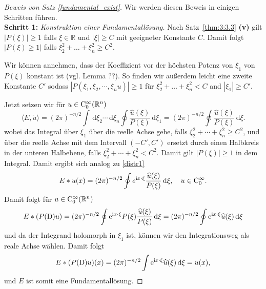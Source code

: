 \begin{proof}[Beweis von Satz \ref{fundamental_exist}]
Wir werden diesen Beweis in einigen Schritten führen.
\vspace{1mm}\\
\textbf{Schritt 1:} \emph{Konstruktion einer Fundamentallösung.}
Nach Satz~\ref{thm:3:3.3} {\bf (v)} gilt $|P(\xi)|\ge 1$ falls $\xi\in \mathbb R$ und $|\xi|\ge C$ mit geeigneter Konstante $C$.  Damit folgt $|P(\xi)\ge 1|$ falls $\xi_2^2+ \ldots + \xi_n^2 \ge C^2$.  

Wir können annehmen, dass der Koeffizient vor der höchsten Potenz von $\xi_1$ von $P(\xi)$ konstant ist (vgl. Lemma ??). 
So finden wir außerdem leicht eine zweite Konstante $C'$ sodass $|P(\xi_1, \xi_2, \cdots, \xi_nu)|\ge 1$ für $\xi_2^2+\ldots + \xi_n^2< C$ and $|\xi_1|\ge C'$.  

Jetzt setzen wir für $u\in\mathrm C_0^\infty(\mathbb R^n)$
\begin{equation}\label{distr3}
\langle E, \check u\rangle  = (2\pi)^{-n/2} \int \, \mathrm d\xi_2 \cdots \, \mathrm d\xi_n \oint \frac{\widehat u(\xi)}{P(\xi)} \, \mathrm d\xi_1= (2\pi)^{-n/2} \oint \frac{\widehat u(\xi)}{P(\xi)} \, \mathrm d\xi.
\end{equation}
wobei das Integral über $\xi_1$ über die reelle Achse gehe, falls $\xi_2^2+ \cdots + \xi_n^2 \ge C^2$, und über die reelle Achse mit dem Intervall $(-C', C')$ ersetzt durch einen Halbkreis in der unteren Halbebene, falls $\xi_2^2+ \cdots+ \xi_n^2 < C^2$. Damit gilt $|P(\xi)|\ge 1$  in dem Integral.  Damit ergibt sich analog zu \eqref{distr1}
\begin{equation}
E*u(x) = (2\pi)^{-n/2}\oint e^{\mathrm i x\cdot \xi } \frac{\widehat u(\xi)}{P(\xi)}\, \mathrm d\xi, \quad u \in \mathrm C_0^\infty.
\end{equation} 
Damit folgt für $u\in\mathrm C_0^\infty(\mathbb R^n)$
\begin{equation}
E*(P(\mathrm D)u) = (2\pi)^{-n/2} \oint \mathrm e^{\mathrm i x\cdot\xi} P(\xi)  \frac{\widehat{u} (\xi)}{P(\xi)}\, \mathrm d\xi=(2\pi)^{-n/2} \oint \mathrm e^{\mathrm i x\cdot \xi} \widehat u(\xi) \, \mathrm d\xi
\end{equation}
und da der Integrand holomorph in $\xi_1$ ist, können wir den Integrationsweg als reale Achse wählen. Damit folgt
\begin{equation}
E*(P(\mathrm D) u)(x) = (2\pi)^{-n/2} \int \mathrm e^{\mathrm i x\cdot \xi} \widehat u(\xi) \, \mathrm d\xi = u(x),
\end{equation}
und $E$ ist somit eine Fundamentallösung.


\end{proof}
